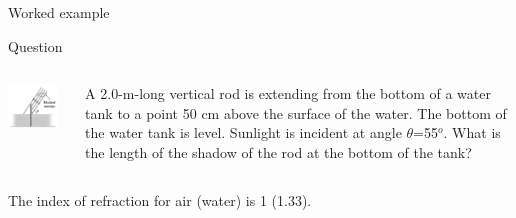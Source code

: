 %
%

{
\problemslide

%
%
%

\begin{frame}{Worked example}

\begin{blockexmplque}{Question}
\begin{columns}
  \begin{column}{0.25\textwidth}
   \begin{center}
     \includegraphics[width=0.90\textwidth]{./images/problems/lect8_pole_shadow.png}
   \end{center}
  \end{column}
  \begin{column}{0.75\textwidth}
     A 2.0-m-long vertical rod is extending
     from the bottom of a water tank to a point 50 cm above the surface
     of the water. The bottom of the water tank is level.
     Sunlight is incident at angle $\theta$=55$^{o}$. What
     is the length of the shadow of the rod at the bottom of the tank?
  \end{column}
\end{columns}
The index of refraction for air (water) is 1 (1.33).
\end{blockexmplque}

\vspace{0.2cm}


\end{frame}}
